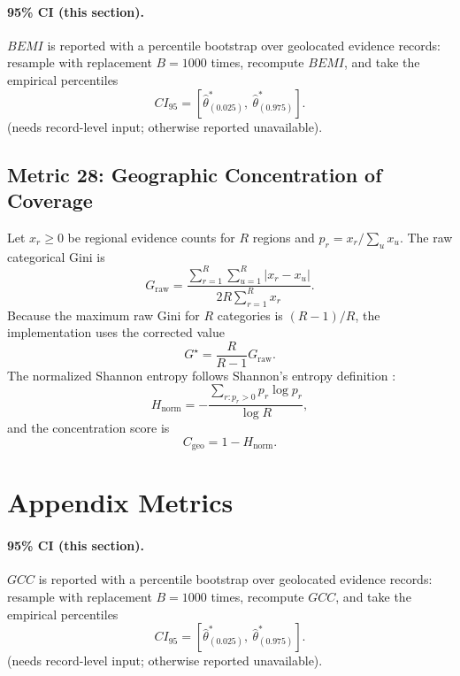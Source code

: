 \documentclass[11pt]{article}
\begin{document}
\paragraph{95\% CI (this section).} $BEMI$ is reported with a percentile bootstrap over geolocated evidence records: resample with replacement $B=1000$ times, recompute $BEMI$, and take the empirical percentiles
\begin{equation}
CI_{95}=\left[\hat\theta^{\ast}_{(0.025)},\ \hat\theta^{\ast}_{(0.975)}\right].
\end{equation} (needs record-level input; otherwise reported unavailable).

\subsection{Metric 28: Geographic Concentration of Coverage}

Let $x_r\ge 0$ be regional evidence counts for $R$ regions and
$p_r=x_r/\sum_u x_u$. The raw categorical Gini is
\begin{equation}
G_{\mathrm{raw}}=
\frac{\sum_{r=1}^{R}\sum_{u=1}^{R}|x_r-x_u|}
{2R\sum_{r=1}^{R}x_r}.
\end{equation}
Because the maximum raw Gini for $R$ categories is $(R-1)/R$, the implementation
uses the corrected value
\begin{equation}
G^\star=\frac{R}{R-1}G_{\mathrm{raw}}.
\end{equation}
The normalized Shannon entropy follows Shannon's entropy definition
\cite{shannon1948}:
\begin{equation}
H_{\mathrm{norm}}=
-\frac{\sum_{r:p_r>0}p_r\log p_r}{\log R},
\end{equation}
and the concentration score is
\begin{equation}
C_{\mathrm{geo}}=1-H_{\mathrm{norm}}.
\end{equation}

\section{Appendix Metrics}


\paragraph{95\% CI (this section).} $GCC$ is reported with a percentile bootstrap over geolocated evidence records: resample with replacement $B=1000$ times, recompute $GCC$, and take the empirical percentiles
\begin{equation}
CI_{95}=\left[\hat\theta^{\ast}_{(0.025)},\ \hat\theta^{\ast}_{(0.975)}\right].
\end{equation} (needs record-level input; otherwise reported unavailable).
\end{document}
